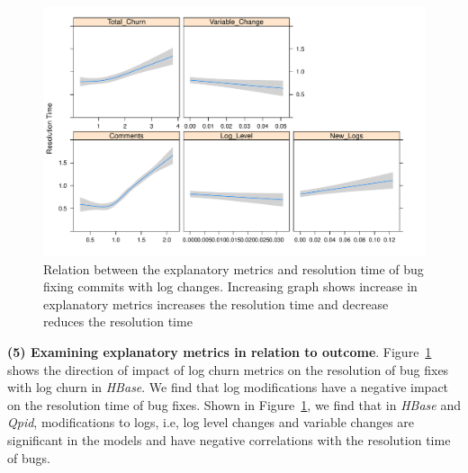 \begin{figure}[t]
	\begin{minipage}{0.5\columnwidth}
		\hspace*{1.9cm}	\includegraphics[width=1.45\textwidth]{HbaseDirectionPlot}

	\end{minipage}
	\hspace*{1.cm}\caption{Relation between the explanatory metrics and resolution time of bug fixing commits with log changes. Increasing graph shows increase in explanatory metrics increases the resolution time and decrease reduces the resolution time \label{fig:HbaseDirectionPlot}}
\end{figure}

\textbf{(5) Examining explanatory metrics in relation to outcome}. Figure~\ref{fig:HbaseDirectionPlot} shows the direction of impact of log churn metrics on the resolution of bug fixes with log churn in \emph{HBase}. We find that log modifications have a negative impact on the resolution time of bug fixes. Shown in Figure~\ref{fig:HbaseDirectionPlot}, we find that in \emph{HBase} and \emph{Qpid}, modifications to logs, i.e, log level changes and variable changes are significant in the models and have negative correlations with the resolution time of bugs. 

